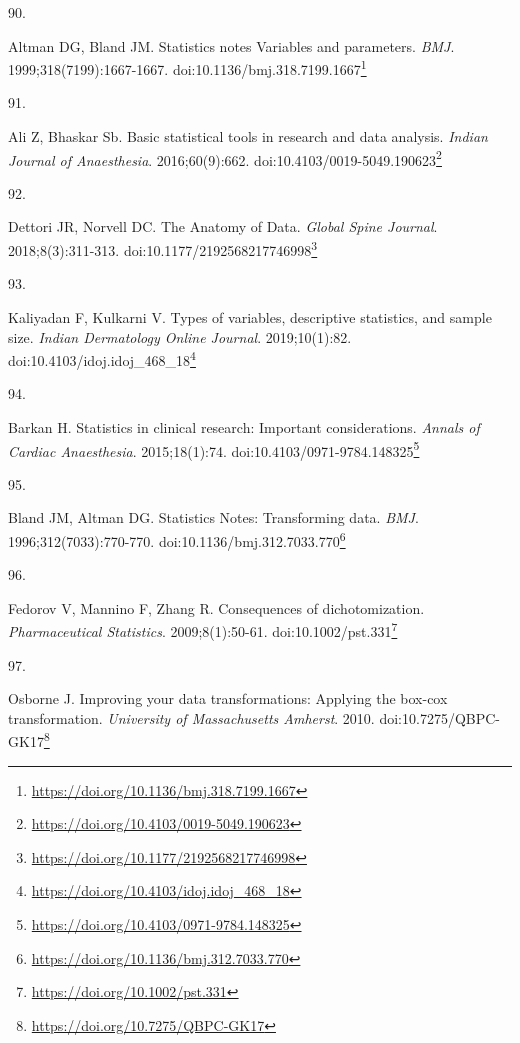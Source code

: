 \documentclass[
  a4paper,
]{book}
\newlength{\cslhangindent}
\newlength{\csllabelwidth}
\newlength{\cslentryspacingunit} %
\newenvironment{CSLReferences}[2] %
 {%
  \setlength{\parindent}{0pt}
  \ifodd #1
  \let\oldpar\par
  \def\par{\hangindent=\cslhangindent\oldpar}
  \fi
  \setlength{\parskip}{#2\cslentryspacingunit}
 }%
 {}
\newcommand{\CSLLeftMargin}[1]{\parbox[t]{\csllabelwidth}{#1}}
\newcommand{\CSLRightInline}[1]{\parbox[t]{\linewidth - \csllabelwidth}{#1}\break}
\renewcommand{\href}[2]{#2\footnote{\url{#1}}}
\begin{document}
\begin{CSLReferences}{0}{0}
\leavevmode{}%
\CSLLeftMargin{90. }%
\CSLRightInline{Altman DG, Bland JM. Statistics notes Variables and parameters. \emph{BMJ}. 1999;318(7199):1667-1667. doi:\href{https://doi.org/10.1136/bmj.318.7199.1667}{10.1136/bmj.318.7199.1667}}

\leavevmode{}%
\CSLLeftMargin{91. }%
\CSLRightInline{Ali Z, Bhaskar Sb. Basic statistical tools in research and data analysis. \emph{Indian Journal of Anaesthesia}. 2016;60(9):662. doi:\href{https://doi.org/10.4103/0019-5049.190623}{10.4103/0019-5049.190623}}

\leavevmode{}%
\CSLLeftMargin{92. }%
\CSLRightInline{Dettori JR, Norvell DC. The Anatomy of Data. \emph{Global Spine Journal}. 2018;8(3):311-313. doi:\href{https://doi.org/10.1177/2192568217746998}{10.1177/2192568217746998}}

\leavevmode{}%
\CSLLeftMargin{93. }%
\CSLRightInline{Kaliyadan F, Kulkarni V. Types of variables, descriptive statistics, and sample size. \emph{Indian Dermatology Online Journal}. 2019;10(1):82. doi:\href{https://doi.org/10.4103/idoj.idoj_468_18}{10.4103/idoj.idoj\_468\_18}}

\leavevmode{}%
\CSLLeftMargin{94. }%
\CSLRightInline{Barkan H. Statistics in clinical research: Important considerations. \emph{Annals of Cardiac Anaesthesia}. 2015;18(1):74. doi:\href{https://doi.org/10.4103/0971-9784.148325}{10.4103/0971-9784.148325}}

\leavevmode{}%
\CSLLeftMargin{95. }%
\CSLRightInline{Bland JM, Altman DG. Statistics Notes: Transforming data. \emph{BMJ}. 1996;312(7033):770-770. doi:\href{https://doi.org/10.1136/bmj.312.7033.770}{10.1136/bmj.312.7033.770}}

\leavevmode{}%
\CSLLeftMargin{96. }%
\CSLRightInline{Fedorov V, Mannino F, Zhang R. Consequences of dichotomization. \emph{Pharmaceutical Statistics}. 2009;8(1):50-61. doi:\href{https://doi.org/10.1002/pst.331}{10.1002/pst.331}}

\leavevmode{}%
\CSLLeftMargin{97. }%
\CSLRightInline{Osborne J. Improving your data transformations: Applying the box-cox transformation. \emph{University of Massachusetts Amherst}. 2010. doi:\href{https://doi.org/10.7275/QBPC-GK17}{10.7275/QBPC-GK17}}


\end{CSLReferences}
\end{document}
